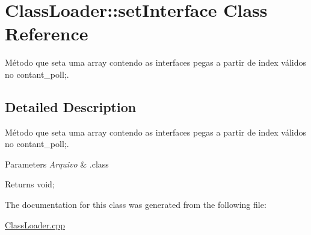 \hypertarget{class_class_loader_1_1set_interface}{}\section{Class\+Loader\+:\+:set\+Interface Class Reference}
\label{class_class_loader_1_1set_interface}


Método que seta uma array contendo as interfaces pegas a partir de index válidos no contant\+\_\+poll;.  




\subsection{Detailed Description}
Método que seta uma array contendo as interfaces pegas a partir de index válidos no contant\+\_\+poll;. 


\begin{DoxyParams}{Parameters}
{\em Arquivo} & .class \\
\hline
\end{DoxyParams}
\begin{DoxyReturn}{Returns}
void; 
\end{DoxyReturn}


The documentation for this class was generated from the following file\+:\begin{DoxyCompactItemize}
\item 
\hyperlink{_class_loader_8cpp}{Class\+Loader.\+cpp}\end{DoxyCompactItemize}
